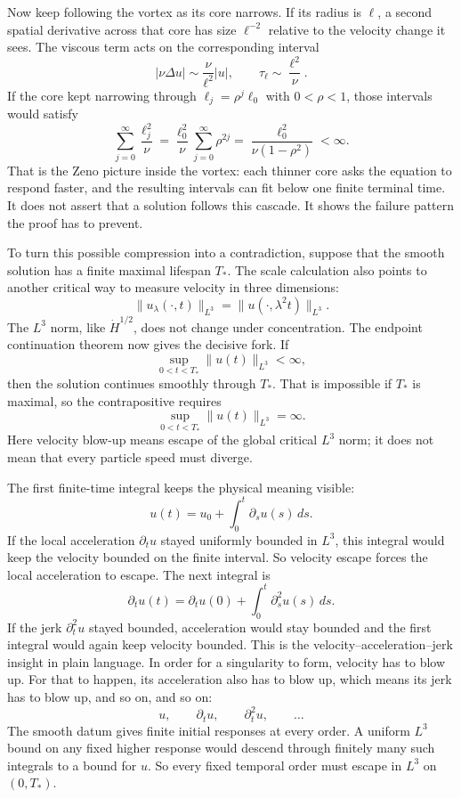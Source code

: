 Now keep following the vortex as its core narrows.  If its radius is
\(\ell\), a second spatial derivative across that core has size
\(\ell^{-2}\) relative to the velocity change it sees.  The viscous term acts
on the corresponding interval
\[
|\nu\Delta u|
\sim\frac{\nu}{\ell^2}|u|,
\qquad
\tau_\ell\sim\frac{\ell^2}{\nu}.
\]
If the core kept narrowing through
\(\ell_j=\rho^j\ell_0\) with \(0<\rho<1\), those intervals would satisfy
\[
\sum_{j=0}^{\infty}\frac{\ell_j^2}{\nu}
=\frac{\ell_0^2}{\nu}\sum_{j=0}^{\infty}\rho^{2j}
=\frac{\ell_0^2}{\nu(1-\rho^2)}<\infty.
\]
That is the Zeno picture inside the vortex: each thinner core asks the equation
to respond faster, and the resulting intervals can fit below one finite
terminal time.  It does not assert that a solution follows this cascade.  It
shows the failure pattern the proof has to prevent.

To turn this possible compression into a contradiction, suppose that the smooth
solution has a finite maximal lifespan \(T_*\).  The scale calculation also
points to another critical way to measure velocity in three dimensions:
\[
\|u_\lambda(\cdot,t)\|_{L^3}
=\|u(\cdot,\lambda^2t)\|_{L^3}.
\]
The \(L^3\) norm, like \(\dot H^{1/2}\), does not change under concentration.
The endpoint continuation theorem now gives the decisive fork.  If
\[
\sup_{0<t<T_*}\|u(t)\|_{L^3}<\infty,
\]
then the solution continues smoothly through \(T_*\).  That is impossible if
\(T_*\) is maximal, so the contrapositive requires
\[
\sup_{0<t<T_*}\|u(t)\|_{L^3}=\infty.
\]
Here velocity blow-up means escape of the global critical \(L^3\) norm; it
does not mean that every particle speed must diverge.

The first finite-time integral keeps the physical meaning visible:
\[
u(t)=u_0+\int_0^t\partial_su(s)\,ds.
\]
If the local acceleration \(\partial_tu\) stayed uniformly bounded in
\(L^3\), this integral would keep the velocity bounded on the finite interval.
So velocity escape forces the local acceleration to escape.  The next integral
is
\[
\partial_tu(t)
=\partial_tu(0)+\int_0^t\partial_s^2u(s)\,ds.
\]
If the jerk \(\partial_t^2u\) stayed bounded, acceleration would stay bounded
and the first integral would again keep velocity bounded.  This is the
velocity--acceleration--jerk insight in plain language.  In order for a
singularity to form, velocity has to blow up.  For that to happen, its
acceleration also has to blow up, which means its jerk has to blow up, and so
on, and so on:
\[
u,\qquad \partial_tu,\qquad \partial_t^2u,\qquad\ldots
\]
The smooth datum gives finite initial responses at every order.  A uniform
\(L^3\) bound on any fixed higher response would descend through finitely
many such integrals to a bound for \(u\).  So every fixed temporal order must
escape in \(L^3\) on \((0,T_*)\).

